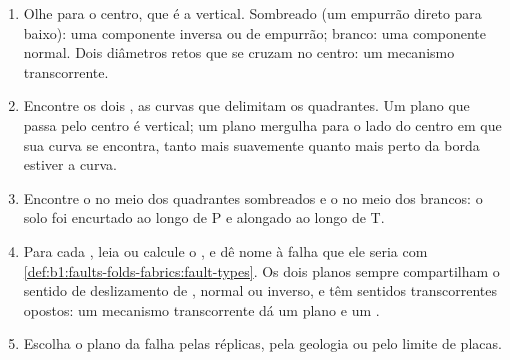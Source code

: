 \begin{method}\label{met:b1:earthquake-source:beachball}
\begin{enumerate}
  \item Olhe para o centro, que é a vertical. Sombreado (um empurrão direto para baixo): uma componente inversa ou de empurrão; branco: uma componente normal. Dois diâmetros retos que se cruzam no centro: um mecanismo transcorrente.
  \item Encontre os dois , as curvas que delimitam os quadrantes. Um plano que passa pelo centro é vertical; um plano mergulha para o lado do centro em que sua curva se encontra, tanto mais suavemente quanto mais perto da borda estiver a curva.
  \item Encontre o  no meio dos quadrantes sombreados e o  no meio dos brancos: o solo foi encurtado ao longo de P e alongado ao longo de T.
  \item Para cada , leia ou calcule o , e dê nome à falha que ele seria com \cref{def:b1:faults-folds-fabrics:fault-types}. Os dois planos sempre compartilham o sentido de deslizamento de , normal ou inverso, e têm sentidos transcorrentes opostos: um mecanismo transcorrente dá um plano  e um .
  \item Escolha o plano da falha pelas réplicas, pela geologia ou pelo limite de placas.
\end{enumerate}
\end{method}

